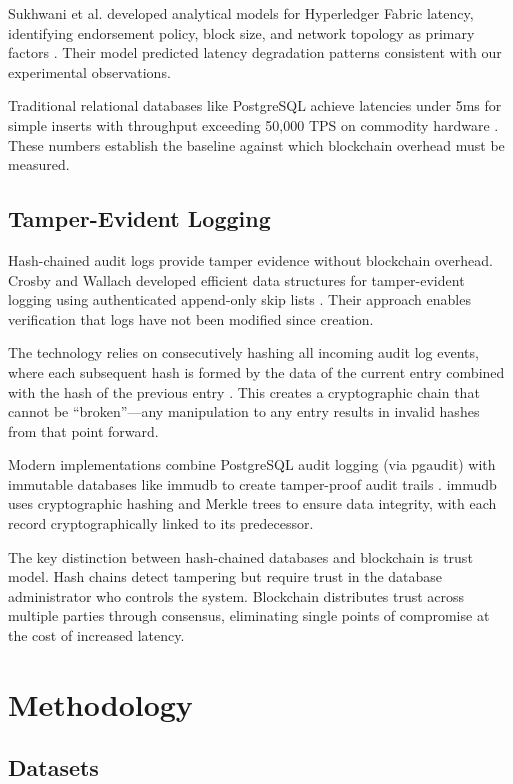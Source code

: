 \documentclass[conference]{IEEEtran}
\begin{document}
Sukhwani et al. developed analytical models for Hyperledger Fabric latency, identifying endorsement policy, block size, and network topology as primary factors \cite{sukhwani2024}. Their model predicted latency degradation patterns consistent with our experimental observations.

Traditional relational databases like PostgreSQL achieve latencies under 5ms for simple inserts with throughput exceeding 50,000 TPS on commodity hardware \cite{postgresql2024}. These numbers establish the baseline against which blockchain overhead must be measured.

\subsection{Tamper-Evident Logging}

Hash-chained audit logs provide tamper evidence without blockchain overhead. Crosby and Wallach developed efficient data structures for tamper-evident logging using authenticated append-only skip lists \cite{crosby2009}. Their approach enables verification that logs have not been modified since creation.

The technology relies on consecutively hashing all incoming audit log events, where each subsequent hash is formed by the data of the current entry combined with the hash of the previous entry \cite{cossacklabs2024}. This creates a cryptographic chain that cannot be ``broken''---any manipulation to any entry results in invalid hashes from that point forward.

Modern implementations combine PostgreSQL audit logging (via pgaudit) with immutable databases like immudb to create tamper-proof audit trails \cite{codenotary2024}. immudb uses cryptographic hashing and Merkle trees to ensure data integrity, with each record cryptographically linked to its predecessor.

The key distinction between hash-chained databases and blockchain is trust model. Hash chains detect tampering but require trust in the database administrator who controls the system. Blockchain distributes trust across multiple parties through consensus, eliminating single points of compromise at the cost of increased latency.

\section{Methodology}
\label{sec:methodology}

\subsection{Datasets}
\end{document}
